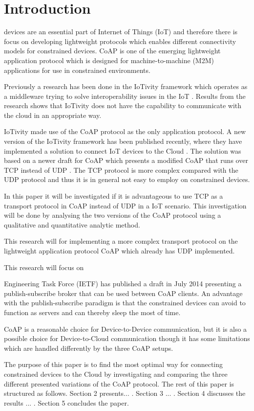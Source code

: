 \section{Introduction}
% 
% 
 devices are an essential part of Internet of Things (IoT) and therefore there is focus on developing lightweight protocols which enables different connectivity models for constrained devices.  
CoAP is one of the emerging lightweight application protocol which is designed for machine-to-machine (M2M) applications for use in constrained environments.   

Previously a research has been done in the IoTivity framework which operates as a middleware trying to solve interoperability issues in the IoT \cite{interoperabilityChallenge}. Results from the research shows that IoTivity does not have the capability to communicate with the cloud in an appropriate way. 

IoTivity made use of the CoAP protocol as the only application protocol. 
A new version of the IoTivity framework has been published recently, where they have implemented a solution to connect IoT devices to the Cloud \cite{iotivity1.1}. The solution was based on a newer draft for CoAP \cite{coapTCP} which presents a modified CoAP that runs over TCP instead of UDP \cite{coapUDP}.
The TCP protocol is more complex compared with the UDP protocol and thus it is in general not easy to employ on constrained devices. 

In this paper it will be investigated if it is advantageous to use TCP as a transport protocol in CoAP instead of UDP in a IoT scenario. This investigation will be done by analysing the two versions of the CoAP protocol using a qualitative and quantitative analytic method.


This research will  for implementing a more complex transport protocol on the lightweight application protocol CoAP which already has UDP implemented.

This research will focus on 

Engineering Task Force (IETF) has published a draft in July 2014 presenting a publish-subscribe broker that can be used between CoAP clients. An advantage with the publish-subscribe paradigm is that the constrained devices can avoid to function as servers and can thereby sleep the most of time.

CoAP is a reasonable choice for Device-to-Device communication,  but it is also a possible choice for Device-to-Cloud communication though it has some limitations which are handled differently by the three CoAP setups.

The purpose of this paper is to find the most optimal way for connecting constrained devices to the Cloud by investigating and comparing the three different presented variations of the CoAP protocol. The rest of this paper is structured as follows.  Section 2 presents... . Section 3 ... . Section 4 discusses the results ... . Section 5 concludes the paper.     
